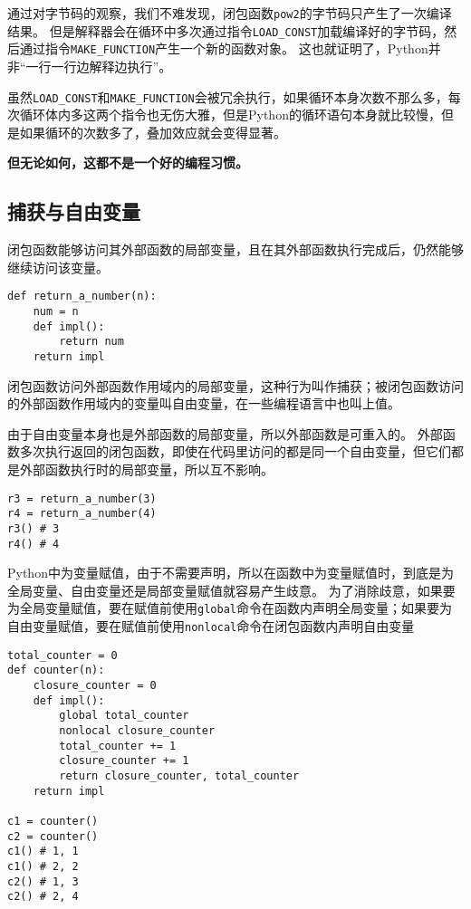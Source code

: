 \documentclass{ctexbook}
\begin{document}
通过对字节码的观察，我们不难发现，闭包函数\verb|pow2|的字节码只产生了一次编译结果。
但是解释器会在循环中多次通过指令\verb|LOAD_CONST|加载编译好的字节码，然后通过指令\verb|MAKE_FUNCTION|产生一个新的函数对象。
这也就证明了，Python并非``一行一行边解释边执行''。

虽然\verb|LOAD_CONST|和\verb|MAKE_FUNCTION|会被冗余执行，如果循环本身次数不那么多，每次循环体内多这两个指令也无伤大雅，但是Python的循环语句本身就比较慢，但是如果循环的次数多了，叠加效应就会变得显著。

\textbf{但无论如何，这都不是一个好的编程习惯。}

\subsection{捕获与自由变量}

闭包函数能够访问其外部函数的局部变量，且在其外部函数执行完成后，仍然能够继续访问该变量。

\begin{verbatim}
def return_a_number(n):
    num = n
    def impl():
        return num
    return impl
\end{verbatim}

闭包函数访问外部函数作用域内的局部变量，这种行为叫作捕获；被闭包函数访问的外部函数作用域内的变量叫自由变量，在一些编程语言中也叫上值。

由于自由变量本身也是外部函数的局部变量，所以外部函数是可重入的。
外部函数多次执行返回的闭包函数，即使在代码里访问的都是同一个自由变量，但它们都是外部函数执行时的局部变量，所以互不影响。

\begin{verbatim}
r3 = return_a_number(3)
r4 = return_a_number(4)
r3() # 3
r4() # 4
\end{verbatim}

Python中为变量赋值，由于不需要声明，所以在函数中为变量赋值时，到底是为全局变量、自由变量还是局部变量赋值就容易产生歧意。
为了消除歧意，如果要为全局变量赋值，要在赋值前使用\verb|global|命令在函数内声明全局变量；如果要为自由变量赋值，要在赋值前使用\verb|nonlocal|命令在闭包函数内声明自由变量

\begin{verbatim}
total_counter = 0
def counter(n):
    closure_counter = 0
    def impl():
        global total_counter
        nonlocal closure_counter
        total_counter += 1
        closure_counter += 1
        return closure_counter, total_counter
    return impl

c1 = counter()
c2 = counter()
c1() # 1, 1
c1() # 2, 2
c2() # 1, 3
c2() # 2, 4
\end{verbatim}
\end{document}
